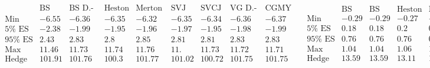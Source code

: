 \documentclass{article}
\begin{document}
\[\begin{array}{ccc}
 
\begin{array}{rrrrrrrrr}
 \text{} & \text{BS Delta} & \text{BS D.-Gamma} & \text{Heston D.-Vega} & \text{Merton D.-Gamma} & \text{SVJ D.-Vega} & \text{SVCJ D.-Vega} & \text{VG
D.-Gamma} & \text{CGMY D.-Gamma} \\
 \text{Min} & -6.55 & -6.36 & -6.35 & -6.32 & -6.35 & -6.34 & -6.36 & -6.37 \\
 \text{5$\%$ ES} & -2.38 & -1.99 & -1.95 & -1.96 & -1.97 & -1.95 & -1.98 & -1.99 \\
 \text{95$\%$ ES} & 2.43 & 2.83 & 2.8 & 2.85 & 2.81 & 2.81 & 2.83 & 2.83 \\
 \text{Max} & 11.46 & 11.73 & 11.74 & 11.76 & 11. & 11.73 & 11.72 & 11.71 \\
 \text{Hedge error} & 101.91 & 101.76 & 100.3 & 101.77 & 101.02 & 100.72 & 101.75 & 101.75 \\
\end{array}
 & 
\begin{array}{rrrrrrrrr}
 \text{} & \text{BS Delta} & \text{BS Delta} & \text{Heston MV} & \text{Merton Delta} & \text{SVJ MV} & \text{SVCJ Delta} & \text{VG Delta} & \text{CGMY
Delta} \\
 \text{Min} & -0.29 & -0.29 & -0.27 & -0.28 & -0.25 & -0.25 & -0.28 & -0.28 \\
 \text{5$\%$ ES} & 0.18 & 0.18 & 0.2 & 0.15 & 0.19 & 0.2 & 0.19 & 0.19 \\
 \text{95$\%$ ES} & 0.76 & 0.76 & 0.76 & 0.73 & 0.77 & 0.75 & 0.75 & 0.75 \\
 \text{Max} & 1.04 & 1.04 & 1.06 & 1.05 & 1.12 & 1.07 & 1.12 & 1.12 \\
 \text{Hedge error} & 13.59 & 13.59 & 13.11 & 13.53 & 13.82 & 12.82 & 13.18 & 13.18 \\
\end{array}
 & 
\begin{array}{rrrrrrrrr}
 \text{} & \text{BS Delta} & \text{BS D.-Gamma} & \text{Heston D.-Vega} & \text{Merton D.-Gamma} & \text{SVJ D.-Gamma} & \text{SVCJ D.-Gamma} & \text{VG
D.-Gamma} & \text{CGMY D.-Gamma} \\
 \text{Min} & -4.36 & -2.69 & -2.64 & -2.64 & -2.44 & -2.58 & -2.7 & -2.71 \\
 \text{5$\%$ ES} & -1.56 & -0.8 & -0.76 & -0.77 & -0.7 & -0.78 & -0.83 & -0.84 \\
 \text{95$\%$ ES} & 0.6 & 0.93 & 0.9 & 0.97 & 1.11 & 1. & 0.91 & 0.9 \\
 \text{Max} & 3.88 & 3.33 & 3.32 & 4.52 & 4.57 & 4.45 & 4.49 & 4.55 \\
 \text{Hedge error} & 50.06 & 34.48 & 33.09 & 34.57 & 40.02 & 37.4 & 34.63 & 34.67 \\
\end{array}
 \\
 

\end{array}\]
\end{document}
